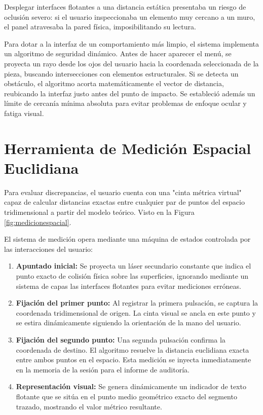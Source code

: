 Desplegar interfaces flotantes a una distancia estática presentaba un riesgo de oclusión severo: si el usuario inspeccionaba un elemento muy cercano a un muro, el panel atravesaba la pared física, imposibilitando su lectura. 

Para dotar a la interfaz de un comportamiento más limpio, el sistema implementa un algoritmo de seguridad dinámico. Antes de hacer aparecer el menú, se proyecta un rayo desde los ojos del usuario hacia la coordenada seleccionada de la pieza, buscando intersecciones con elementos estructurales. Si se detecta un obstáculo, el algoritmo acorta matemáticamente el vector de distancia, reubicando la interfaz justo antes del punto de impacto. Se estableció además un límite de cercanía mínima absoluta para evitar problemas de enfoque ocular y fatiga visual.




\section{Herramienta de Medición Espacial Euclidiana}

Para evaluar discrepancias, el usuario cuenta con una "cinta métrica virtual" capaz de calcular distancias exactas entre cualquier par de puntos del espacio tridimensional a partir del modelo teórico. Visto en la Figura \ref{fig:medicionespacial}.

El sistema de medición opera mediante una máquina de estados controlada por las interacciones del usuario:
\begin{enumerate}
    \item \textbf{Apuntado inicial:} Se proyecta un láser secundario constante que indica el punto exacto de colisión física sobre las superficies, ignorando mediante un sistema de capas las interfaces flotantes para evitar mediciones erróneas.
    \item \textbf{Fijación del primer punto:} Al registrar la primera pulsación, se captura la coordenada tridimensional de origen. La cinta visual se ancla en este punto y se estira dinámicamente siguiendo la orientación de la mano del usuario.
    \item \textbf{Fijación del segundo punto:} Una segunda pulsación confirma la coordenada de destino. El algoritmo resuelve la distancia euclidiana exacta entre ambos puntos en el espacio. Esta medición se inyecta inmediatamente en la memoria de la sesión para el informe de auditoría.
    \item \textbf{Representación visual:} Se genera dinámicamente un indicador de texto flotante que se sitúa en el punto medio geométrico exacto del segmento trazado, mostrando el valor métrico resultante.
\end{enumerate}


